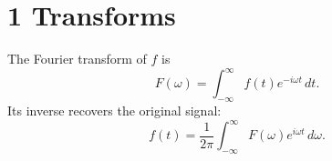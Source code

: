 \documentclass{article}
\begin{document}
\section*{1 \quad Transforms}

The Fourier transform of $f$ is
\begin{equation}
    F(\omega) = \int_{-\infty}^{\infty} f(t)e^{-i\omega t} \, dt.
\end{equation}
Its inverse recovers the original signal:
\begin{equation}
    f(t) = \frac{1}{2\pi} \int_{-\infty}^{\infty} F(\omega)e^{i\omega t} \, d\omega.
\end{equation}
\end{document}
